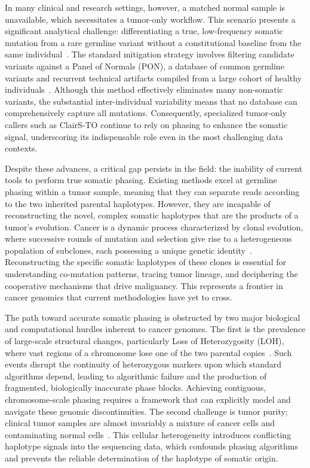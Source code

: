 \documentclass[pdflatex,sn-nature]{sn-jnl}
\begin{document}
In many clinical and research settings, however, a matched normal sample is unavailable, which necessitates a tumor-only workflow. This scenario presents a significant analytical challenge: differentiating a true, low-frequency somatic mutation from a rare germline variant without a constitutional baseline from the same individual~\cite{sun2018, hiltemann2015, chin2023}. The standard mitigation strategy involves filtering candidate variants against a Panel of Normals (PON), a database of common germline variants and recurrent technical artifacts compiled from a large cohort of healthy individuals~\cite{cibulskis2013}. Although this method effectively eliminates many non-somatic variants, the substantial inter-individual variability means that no database can comprehensively capture all mutations. Consequently, specialized tumor-only callers such as ClairS-TO continue to rely on phasing to enhance the somatic signal, underscoring its indispensable role even in the most challenging data contexts.

Despite these advances, a critical gap persists in the field: the inability of current tools to perform true somatic phasing. Existing methods excel at germline phasing within a tumor sample, meaning that they can separate reads according to the two inherited parental haplotypes. However, they are incapable of reconstructing the novel, complex somatic haplotypes that are the products of a tumor's evolution. Cancer is a dynamic process characterized by clonal evolution, where successive rounds of mutation and selection give rise to a heterogeneous population of subclones, each possessing a unique genetic identity~\cite{nowell1976}. Reconstructing the specific somatic haplotypes of these clones is essential for understanding co-mutation patterns, tracing tumor lineage, and deciphering the cooperative mechanisms that drive malignancy. This represents a frontier in cancer genomics that current methodologies have yet to cross.

The path toward accurate somatic phasing is obstructed by two major biological and computational hurdles inherent to cancer genomes. The first is the prevalence of large-scale structural changes, particularly Loss of Heterozygosity (LOH), where vast regions of a chromosome lose one of the two parental copies~\cite{zheng2005, zhang2021, hwang2021}. Such events disrupt the continuity of heterozygous markers upon which standard algorithms depend, leading to algorithmic failure and the production of fragmented, biologically inaccurate phase blocks. Achieving contiguous, chromosome-scale phasing requires a framework that can explicitly model and navigate these genomic discontinuities. The second challenge is tumor purity; clinical tumor samples are almost invariably a mixture of cancer cells and contaminating normal cells~\cite{yadav2015, zheng2017, rhee2018}. This cellular heterogeneity introduces conflicting haplotype signals into the sequencing data, which confounds phasing algorithms and prevents the reliable determination of the haplotype of somatic origin.
\end{document}
